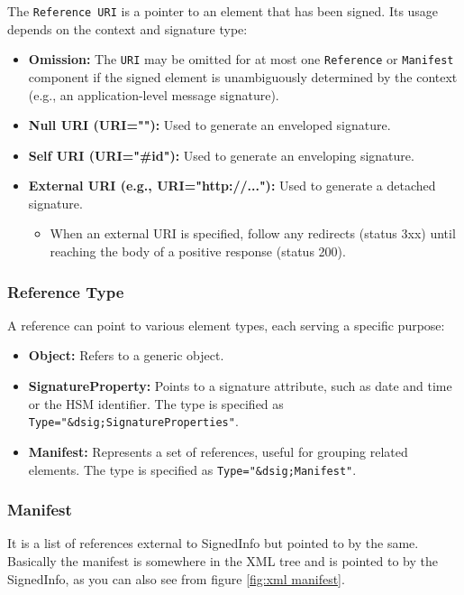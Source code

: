 The \texttt{Reference URI} is a pointer to an element that has been
signed. Its usage depends on the context and signature type:

\begin{itemize}
  \item \textbf{Omission:} The \texttt{URI} may be omitted for at
    most one \texttt{Reference} or \texttt{Manifest} component if
    the signed element is unambiguously determined by the context
    (e.g., an application-level message signature).
  \item \textbf{Null URI (URI=""):} Used to generate an enveloped
    signature.
  \item \textbf{Self URI (URI="\#id"):} Used to generate an
    enveloping signature.
  \item \textbf{External URI (e.g., URI="http://..."):} Used to
    generate a detached signature.
    \begin{itemize}
      \item When an external URI is specified, follow any redirects
        (status 3xx) until reaching the body of a positive response
        (status 200).
    \end{itemize}
\end{itemize}

\subsubsection{Reference Type}

A reference can point to various element types, each serving a
specific purpose:

\begin{itemize}
  \item \textbf{Object:} Refers to a generic object.
  \item \textbf{SignatureProperty:} Points to a signature attribute,
    such as date and time or the HSM identifier. The type is
    specified as \texttt{Type="\&dsig;SignatureProperties"}.
  \item \textbf{Manifest:} Represents a set of references, useful
    for grouping related elements. The type is specified as
    \texttt{Type="\&dsig;Manifest"}.
\end{itemize}

\subsubsection{Manifest}
It is a list of references external to SignedInfo but pointed to by
the same. Basically the manifest is somewhere in the XML tree and is
pointed to by the SignedInfo, as you can also see from figure 
\ref{fig:xml manifest}.

